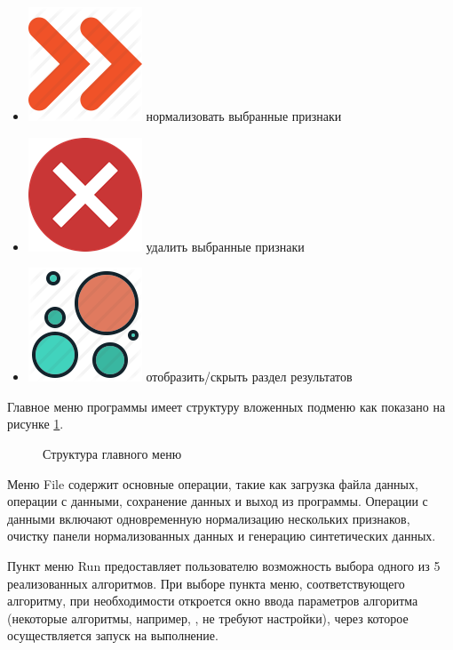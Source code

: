 \documentclass[12pt]{diploma}
\begin{document}
\begin{itemize}
		\item \includegraphics[scale=0.1]{img/norm_all} нормализовать выбранные признаки
		\item \includegraphics[scale=0.1]{img/delete} удалить выбранные признаки
		\item \includegraphics[scale=0.1]{img/clustering} отобразить/скрыть раздел результатов
	\end{itemize}
	
	Главное меню программы имеет структуру вложенных подменю как показано на рисунке \ref{fig:menu}.
	\begin{figure}[h!]
		\centering
						
		\caption{Структура главного меню}
		\label{fig:menu}
	\end{figure}
	
	Меню File содержит основные операции, такие как загрузка файла данных, операции с данными, сохранение данных и выход из программы. Операции с данными включают одновременную нормализацию нескольких признаков, очистку панели нормализованных данных и генерацию синтетических данных. 
	
	Пункт меню Run предоставляет пользователю возможность выбора одного из 5 реализованных алгоритмов. При выборе пункта меню, соответствующего алгоритму, при необходимости откроется окно ввода параметров алгоритма (некоторые алгоритмы, например, \dePDDP, не требуют настройки), через которое осуществляется запуск на выполнение.
	
\end{document}

